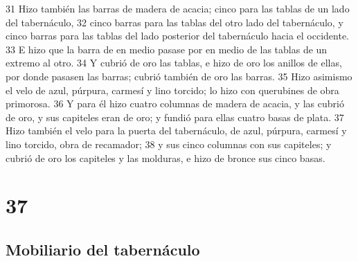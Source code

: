 31 Hizo también las barras de madera de acacia; cinco para las tablas de un lado del tabernáculo,
32 cinco barras para las tablas del otro lado del tabernáculo, y cinco barras para las tablas del lado posterior del tabernáculo hacia el occidente.
33 E hizo que la barra de en medio pasase por en medio de las tablas de un extremo al otro.
34 Y cubrió de oro las tablas, e hizo de oro los anillos de ellas, por donde pasasen las barras; cubrió también de oro las barras.
35 Hizo asimismo el velo de azul, púrpura, carmesí y lino torcido; lo hizo con querubines de obra primorosa.
36 Y para él hizo cuatro columnas de madera de acacia, y las cubrió de oro, y sus capiteles eran de oro; y fundió para ellas cuatro basas de plata.
37 Hizo también el velo para la puerta del tabernáculo, de azul, púrpura, carmesí y lino torcido, obra de recamador;
38 y sus cinco columnas con sus capiteles; y cubrió de oro los capiteles y las molduras, e hizo de bronce sus cinco basas.

\chapter{37}

\section{Mobiliario del tabernáculo}

